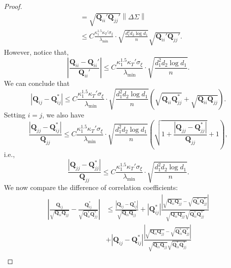 \documentclass[12pt]{article}
\newcommand{\abs}[1]{\left\lvert#1\right\rvert}
\newcommand{\norm}[1]{\left\lVert#1\right\rVert}
\theoremstyle{plain}
\begin{document}
\begin{proof}
\begin{equation*}
\begin{aligned}
      & = \sqrt{\mathbf{Q}_{ii}'\mathbf{Q}_{jj}'}\norm{\Delta \Sigma}  \\
      & \le C\frac{\kappa_1^{1.5} \kappa_T'  \sigma_{\xi} }{ \lambda_{\min}  }\cdot \sqrt{\frac{ d_1^2 d_2 \log d_1}{n}} \sqrt{\mathbf{Q}_{ii}'\mathbf{Q}_{jj}'}.
    \end{aligned}
\end{equation*}
However, notice that, 
\begin{equation*}
    \abs{\frac{\mathbf{Q}_{ii}- \mathbf{Q}_{ii}'}{\mathbf{Q}_{ii}' } }\le C\frac{\kappa_1^{1.5} \kappa_T'  \sigma_{\xi} }{ \lambda_{\min}  }\cdot \sqrt{\frac{ d_1^2 d_2 \log d_1}{n}}.
\end{equation*}
We can conclude that 
\begin{equation*}
    \abs{\mathbf{Q}_{ij}-\mathbf{Q}_{ij}^*} \le C\frac{\kappa_1^{1.5} \kappa_T'  \sigma_{\xi} }{ \lambda_{\min}  }\cdot \sqrt{\frac{ d_1^2 d_2 \log d_1}{n}} \left(\sqrt{\mathbf{Q}_{ii}\mathbf{Q}_{jj}^* }+ \sqrt{\mathbf{Q}_{ii}\mathbf{Q}_{jj} } \right).
\end{equation*}
Setting $i=j$, we also have
\begin{equation*}
    \frac{\abs{\mathbf{Q}_{jj}-\mathbf{Q}_{ij}^*}}{ \mathbf{Q}_{jj}} \le C\frac{\kappa_1^{1.5} \kappa_T'  \sigma_{\xi} }{ \lambda_{\min}  }\cdot \sqrt{\frac{ d_1^2 d_2 \log d_1}{n}}\left(\sqrt{1+{\frac{\abs{\mathbf{Q}_{jj}-\mathbf{Q}_{jj}^*}}{ \mathbf{Q}_{jj}}} }+ 1 \right),
\end{equation*}
i.e.,
\begin{equation*}
      \frac{\abs{\mathbf{Q}_{jj}-\mathbf{Q}_{jj}^*}}{ \mathbf{Q}_{jj}} \le C\frac{\kappa_1^{1.5} \kappa_T'  \sigma_{\xi} }{ \lambda_{\min}  }\cdot \sqrt{\frac{ d_1^2 d_2 \log d_1}{n}}.
\end{equation*}
We now compare the difference of correlation coefficients:
\begin{equation*}
\begin{aligned}
       \abs{\frac{\mathbf{Q}_{ij} }{\sqrt{\mathbf{Q}_{ii}\mathbf{Q}_{jj}}} - {\frac{\mathbf{Q}_{ij}^* }{\sqrt{\mathbf{Q}_{ii}^*\mathbf{Q}_{jj}^*}} } } &\le \frac{  \abs{\mathbf{Q}_{ij}-\mathbf{Q}_{ij}^*}  }{ \sqrt{\mathbf{Q}_{ii}\mathbf{Q}_{jj}} }+ \abs{\mathbf{Q}_{ij}^*}\frac{\abs{\sqrt{\mathbf{Q}_{ii}\mathbf{Q}_{jj}}-\sqrt{\mathbf{Q}_{ii}^*\mathbf{Q}_{jj}^*}}}{\sqrt{\mathbf{Q}_{ii}\mathbf{Q}_{jj}} \sqrt{\mathbf{Q}_{ii}^*\mathbf{Q}_{jj}^*}  }\\
    & + \abs{\mathbf{Q}_{ij}-\mathbf{Q}_{ij}^*} \frac{\abs{\sqrt{\mathbf{Q}_{ii}\mathbf{Q}_{jj}}-\sqrt{\mathbf{Q}_{ii}^*\mathbf{Q}_{jj}^*}}}{\sqrt{\mathbf{Q}_{ii}\mathbf{Q}_{jj}} \sqrt{\mathbf{Q}_{ii}^*\mathbf{Q}_{jj}^*}  } \\

\end{aligned}
\end{equation*}
\end{proof}
\end{document}
